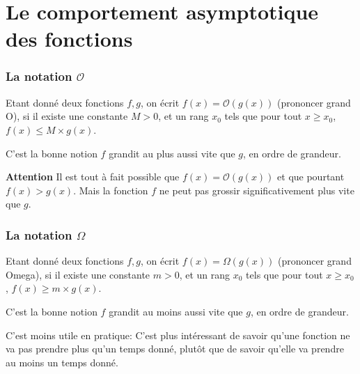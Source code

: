 \documentclass[aspectratio=169]{beamer}
\begin{document}
\section{Le comportement asymptotique des fonctions}
\begin{frame}
  \frametitle{La notation \texorpdfstring{\(\mathcal{O}\)}{grand O}}

  \begin{definition}
    Etant donné deux fonctions \(f,g\), on écrit \(f(x) = \mathcal{O}(g(x))\)
    (prononcer \og grand O\fg{}), si il existe une constante \(M > 0\), et un rang
    \(x_{0}\) tels que
    pour tout \(x \ge x_{0}\), \(f(x) \le M\times g(x)\).
  \end{definition}

  \vspace{.5cm}
  C'est la bonne notion \og \(f\) grandit au plus aussi vite que \(g\), en
  ordre de grandeur\fg{}.

  \vspace{.5cm}
  \textbf{\alert{Attention}} Il est tout à fait possible que \(f(x) =
  \mathcal{O}(g(x))\) et que pourtant  \(f(x) > g(x)\). Mais la fonction \(f\)
  ne peut pas grossir significativement plus vite que \(g\).
\end{frame}

\begin{frame}
  \frametitle{La notation \texorpdfstring{\(\Omega\)}{grand Omega}}

  \begin{definition}
    Etant donné deux fonctions \(f,g\), on écrit \(f(x) = \Omega(g(x))\)
    (prononcer \og grand Omega\fg{}), si il existe une constante \(m > 0\), et un rang
    \(x_{0}\) tels que
    pour tout \(x \ge x_{0}\), \(f(x) \ge m\times g(x)\).
  \end{definition}

  \vspace{.5cm}
  C'est la bonne notion \og \(f\) grandit au moins aussi vite que \(g\), en
  ordre de grandeur\fg{}.

  \vspace{.5cm}
  C'est moins utile en pratique: C'est plus intéressant de savoir qu'une
  fonction ne va pas prendre plus qu'un temps donné, plutôt que de savoir
  qu'elle va prendre au moins un temps donné.
\end{frame}
\end{document}
